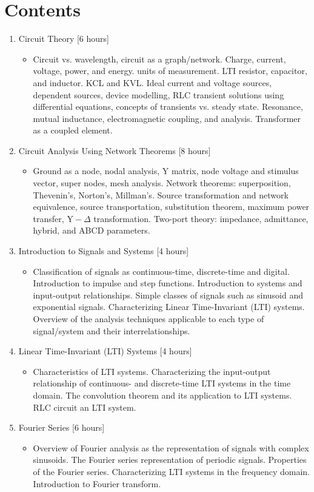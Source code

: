 \documentclass[11pt, a4paper]{article}
\newcommand{\sectioncolor}{\color{SteelBlue} \usefont{OT1}{lmss}{m}{n}}
\begin{document}
\section{\sectioncolor Contents}
\begin{enumerate}
  \item Circuit Theory [6 hours]
  \begin{itemize}
    \item[] Circuit vs. wavelength, circuit as a graph/network. Charge, current, voltage, power, and energy. units of measurement. LTI resistor, capacitor, and inductor. KCL and KVL. Ideal current and voltage sources, dependent sources, device modelling, RLC transient solutions using differential equations, concepts of transients vs. steady state. Resonance, mutual inductance, electromagnetic coupling, and analysis. Transformer as a coupled element.
  \end{itemize}
  \item Circuit Analysis Using Network Theorems [8 hours]
  \begin{itemize}
    \item[] Ground as a node, nodal analysis, Y matrix, node voltage and stimulus vector, super nodes, mesh analysis. Network theorems: superposition, Thevenin’s, Norton’s, Millman’s. Source transformation and network equivalence, source transportation, substitution theorem, maximum power transfer, $\mathrm{Y}-\Delta$ transformation. Two-port theory: impedance, admittance, hybrid, and ABCD parameters.
  \end{itemize}
  \item Introduction to Signals and Systems [4 hours]
  \begin{itemize}
    \item[] Classification of signals as continuous-time, discrete-time and digital. Introduction to impulse and step functions. Introduction to systems and input-output relationships. Simple classes of signals such as sinusoid and exponential signals. Characterizing Linear Time-Invariant (LTI) systems. Overview of the analysis techniques applicable to each type of signal/system and their interrelationships.
  \end{itemize}
  \item Linear Time-Invariant (LTI) Systems [4 hours]
  \begin{itemize}
    \item[] Characteristics of LTI systems. Characterizing the input-output relationship of continuous- and discrete-time LTI systems in the time domain. The convolution theorem and its application to LTI systems. RLC circuit an LTI system.
  \end{itemize}
  \item Fourier Series [6 hours]
  \begin{itemize}
    \item[] Overview of Fourier analysis as the representation of signals with complex sinusoids. The Fourier series representation of periodic signals. Properties of the Fourier series. Characterizing LTI systems in the frequency domain. Introduction to Fourier transform.
  \end{itemize}
\end{enumerate}
\end{document}
